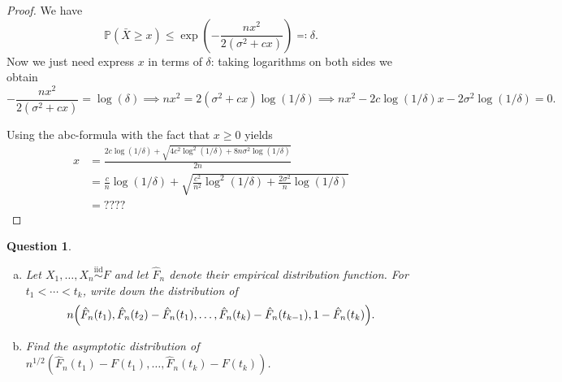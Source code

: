 \documentclass{article}
\theoremstyle{plain}
\newtheorem{question}{Question}
\theoremstyle{remark}
\newcommand{\Bb}{\mathbb}
\newcommand{\Rm}{\mathrm}
\newcommand{\PP}{\Bb P}
\newcommand\iid{\overset{\Rm{iid}}{\sim}}
\begin{document}
\begin{proof}
	We have 
	\[
	\PP(\bar X \geq x) \leq \exp(- \frac{nx^2}{2(\sigma^2 + cx)}) \eqqcolon \delta. 
	\]
	Now we just need express $x$ in terms of $\delta$: taking logarithms on both sides we obtain
	\[
	- \frac{nx^2}{2(\sigma^2 + cx)} = \log(\delta) \implies nx^2 = 2(\sigma^2 + cx) \log(1/\delta) \implies nx^2 - 2c\log(1/\delta) x - 2\sigma^2\log(1/\delta) = 0.
	\]
	
	Using the abc-formula with the fact that $x \geq 0$ yields 
	\begin{align*}
	x &= \frac{2c \log(1/\delta) + \sqrt{4c^2\log^2(1/\delta) + 8n\sigma^2\log(1/\delta)}}{2n} \\
	&= \frac cn \log(1/\delta) + \sqrt{\frac{c^2}{n^2}\log^2(1/\delta) + \frac{2\sigma^2}{n} \log(1/\delta)} \\
	&= ???? 
	\end{align*}
\end{proof}

\begin{question}
	\begin{enumerate}[(a)]
		\item Let $X_1, \dotsc, X_n \iid F$ and let $\hat F_n$ denote their empirical distribution function. For $t_1 < \dotsb < t_k$, write down the distribution of 
		\[
		n\qty(\hat F_n(t_1), \hat F_n(t_2) - \hat F_n(t_1), \dotsc, \hat F_n(t_k) - \hat F_n(t_{k-1}), 1 - \hat F_n(t_k)). 
		\]
		\item Find the asymptotic distribution of $n^{1/2} (\hat F_n(t_1) - F(t_1), \dotsc, \hat F_n(t_k) - F(t_k))$. 
	\end{enumerate}
\end{question}
\end{document}
